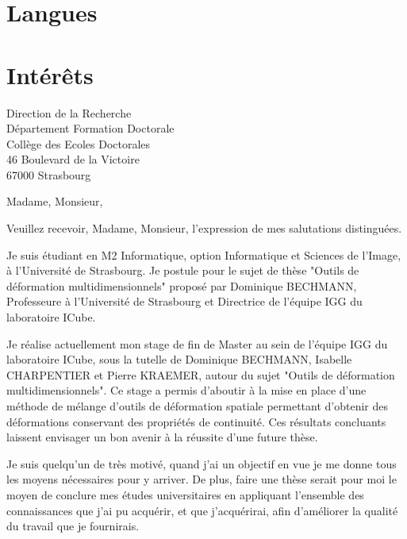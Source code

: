 \documentclass[11pt,a4paper,sans]{moderncv}
\begin{document}
\section{Langues}
\section{Intérêts}

\clearpage
{Direction de la Recherche\\
Département Formation Doctorale\\
Collège des Ecoles Doctorales\\
46 Boulevard de la Victoire\\
67000 Strasbourg}
\date{\mydateformat\today}
\opening{Madame, Monsieur,}
\closing{Veuillez recevoir, Madame, Monsieur, l'expression de mes salutations
distinguées.}
\makelettertitle

Je suis étudiant en M2 Informatique, option Informatique et Sciences de l'Image,
à l'Université de Strasbourg. Je postule pour le sujet de thèse "Outils de
déformation multidimensionnels" proposé par Dominique BECHMANN, Professeure à
l'Université de Strasbourg et Directrice de l'équipe IGG du laboratoire ICube.

Je réalise actuellement mon stage de fin de Master au sein de l'équipe IGG du
laboratoire ICube, sous la tutelle de Dominique BECHMANN, Isabelle CHARPENTIER
et Pierre KRAEMER, autour du sujet "Outils de déformation multidimensionnels".
Ce stage a permis d'aboutir à la mise en place d'une méthode de mélange d'outils
de déformation spatiale permettant d'obtenir des déformations conservant des
propriétés de continuité. Ces résultats concluants laissent envisager un bon
avenir à la réussite d'une future thèse.

Je suis quelqu'un de très motivé, quand j'ai un objectif en vue je me donne tous
les moyens nécessaires pour y arriver. De plus, faire une thèse serait pour moi
le moyen de conclure mes études universitaires en appliquant l'ensemble des
connaissances que j'ai pu acquérir, et que j'acquérirai, afin d'améliorer la
qualité du travail que je fournirais.

\makeletterclosing
\end{document}
